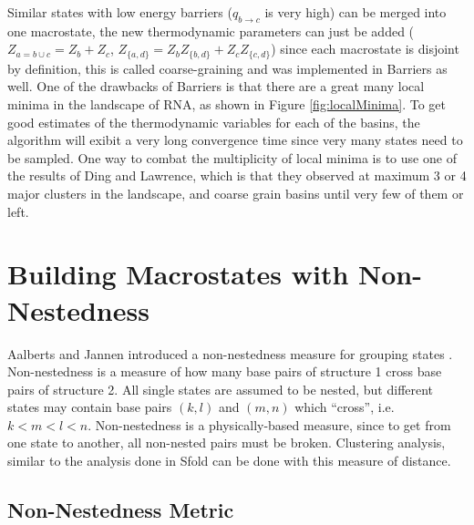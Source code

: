 Similar states with low energy barriers ($q_{b \to c}$ is very high)
can be merged into one macrostate, the new thermodynamic parameters
can just be added ($Z_{a=b\cup c}=Z_b+Z_c$,
$Z_{\{a,d\}}=Z_bZ_{\{b,d\}}+Z_cZ_{\{c,d\}}$) since each macrostate is
disjoint by definition, this is called coarse-graining and was
implemented in Barriers as well. One of the drawbacks of Barriers is
that there are a great many local minima in the landscape of RNA, as
shown in Figure \ref{fig:localMinima}. To get good estimates of the
thermodynamic variables for each of the basins, the algorithm will
exibit a very long convergence time since very many states need to be
sampled. One way to combat the multiplicity of local minima is to use
one of the results of Ding and Lawrence, which is that they observed at
maximum 3 or 4 major clusters in the landscape, and coarse grain
basins until very few of them or left.

\section{Building Macrostates with Non-Nestedness}

Aalberts and Jannen introduced a non-nestedness measure for grouping
states \cite{aalberts2013visualizing}
\cite{aalbertsNestor}. Non-nestedness is a measure of how many base
pairs of structure 1 cross base pairs of structure 2. All single
states are assumed to be nested, but different states may contain base
pairs $(k,l)$ and $(m,n)$ which ``cross'', i.e. $k < m < l < n$.
Non-nestedness is a physically-based measure, since to get from one
state to another, all non-nested pairs must be broken. Clustering
analysis, similar to the analysis done in Sfold can be done with this
measure of distance.

\subsection{Non-Nestedness Metric}


